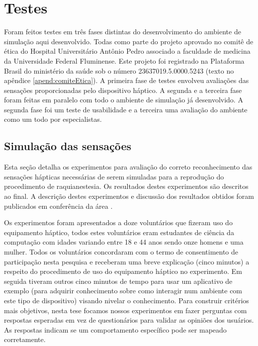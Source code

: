 \chapter{Testes} \label{cap:cap5}

Foram feitos testes em três fases distintas do desenvolvimento do ambiente de simulação aqui desenvolvido. 
Todas como parte do projeto aprovado no comitê de ética do Hospital Universitário Antônio Pedro associado a faculdade de medicina da Universidade Federal Fluminense. Este projeto foi registrado na Plataforma Brasil do ministério da saúde sob o número 23637019.5.0000.5243 (texto no apêndice \ref{apend:comiteEtica}). A primeira fase de testes envolveu avaliações das sensações proporcionadas pelo dispositivo háptico. A segunda e a terceira fase foram feitas em paralelo com todo o ambiente de simulação já desenvolvido. A segunda fase foi um teste de usabilidade e a terceira uma avaliação do ambiente como um todo por especialistas.

\section{Simulação das sensações}
\label{sec:testeSensacoes}

Esta seção detalha os experimentos para avaliação do correto reconhecimento das sensações hápticas necessárias de serem simuladas para a reprodução do procedimento de raquianestesia. Os resultados destes experimentos são descritos ao final. A descrição destes experimentos e discussão dos resultados obtidos foram publicados em conferência da área \cite{Melo2021}. 

Os experimentos foram apresentados a doze voluntários que fizeram uso do equipamento háptico, todos estes voluntários eram estudantes de ciência da computação com idades variando entre 18 e 44 anos sendo onze homens e uma mulher. Todos os voluntários concordaram com o termo de consentimento de participação nesta pesquisa e receberam uma breve explicação (cinco minutos) a respeito do procedimento de uso do equipamento háptico no experimento. Em seguida tiveram outros cinco minutos de tempo para usar um aplicativo de exemplo (para adquirir conhecimento sobre como interagir num ambiente com este tipo de dispositivo) visando nivelar o conhecimento. Para construir critérios mais objetivos, nesta tese focamos nossos experimentos em fazer perguntas com respostas esperadas em vez de questionários para validar as opiniões dos usuários. As respostas indicam se um comportamento específico pode ser mapeado corretamente.

